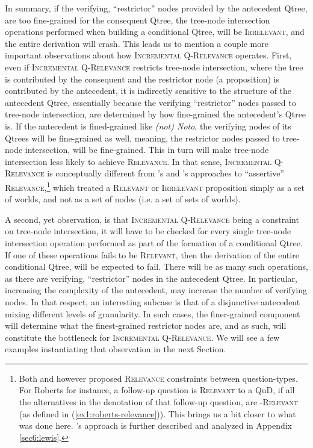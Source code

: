 In summary, if the verifying, ``restrictor'' nodes provided by the antecedent Qtree, are too fine-grained for the consequent Qtree, the tree-node intersection operations performed when building a conditional Qtree, will be \textsc{Irrelevant}, and the entire derivation will crash. This leads us to mention a couple more important observations about how \textsc{Incremental Q-Relevance} operates. First, even if \textsc{Incremental Q-Relevance} restricts tree-node intersection, where the tree is contributed by the consequent and the restrictor node (a proposition) is contributed by the antecedent, it is indirectly sensitive to the structure of the antecedent Qtree, essentially because the verifying ``restrictor'' nodes passed to tree-node intersection, are determined by how fine-grained the antecedent's Qtree is. If the antecedent is fined-grained like \textit{(not) Noto}, the verifying nodes of its Qtrees will be fine-grained as well, meaning, the restrictor nodes passed to tree-node intersection, will be fine-grained. This in turn will make tree-node intersection less likely to achieve \textsc{Relevance}. In that sense, \textsc{Incremental Q-Relevance} is conceptually different from \citeauthor{Lewis1988}'s and \citet{Roberts2012}'s approaches to ``assertive'' \textsc{Relevance},\footnote{Both \citeauthor{Lewis1988} and \citet{Roberts2012} however proposed \textsc{Relevance} constraints between question-types. For Roberts for instance, a follow-up question is \textsc{Relevant} to a QuD, if all the alternatives in the denotation of that follow-up question, are \textsc{\citeauthor{Roberts2012}-Relevant} (as defined in (\ref{ex1:roberts-relevance})). This brings us a bit closer to what was done here. \citeauthor{Lewis1988}'s approach is further described and analyzed in Appendix \ref{sec6:lewis}.} which treated a \textsc{Relevant} or \textsc{Irrelevant} proposition simply as a set of worlds, and not as a set of nodes (i.e. a set of sets of worlds).

A second, yet observation, is that \textsc{Incremental Q-Relevance} being a constraint on tree-node intersection, it will have to be checked for every single tree-node intersection operation performed as part of the formation of a conditional Qtree. If one of these operations fails to be \textsc{Relevant}, then the derivation of the entire conditional Qtree, will be expected to fail. There will be as many such operations, as there are verifying, ``restrictor'' nodes in the antecedent Qtree. In particular, increasing the complexity of the antecedent, may increase the number of verifying nodes. In that respect, an interesting subcase is that of a disjunctive antecedent mixing different levels of granularity. In such cases, the finer-grained component will determine what the finest-grained restrictor nodes are, and as such, will constitute the bottleneck for \textsc{Incremental Q-Relevance}. We will see a few examples instantiating that observation in the next Section.



